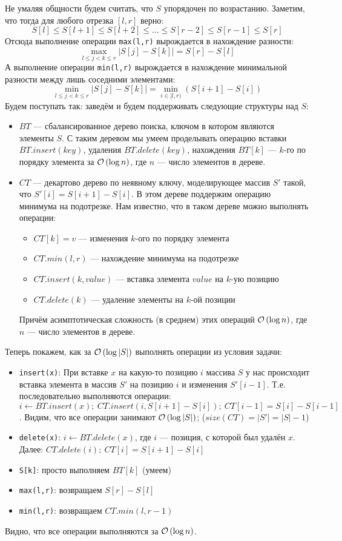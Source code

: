 \begin{solution}
Не умаляя общности будем считать, что $S$ упорядочен по возрастанию.
Заметим, что тогда для любого отрезка $[l, r]$ верно:
\[
	S[l] \leqslant S[l + 1] \leqslant S[l + 2] \leqslant \ldots \leqslant S[r - 2] \leqslant S[r - 1] \leqslant S[r]
\]
Отсюда выполнение операции \texttt{max(l,r)} вырождается в нахождение разности:
\[
	\max_{l \leqslant j < k \leqslant r}{|S[j]-S[k]|} = S[r] - S[l]
\]
А выполнение операции \texttt{min(l,r)} вырождается в нахождение минимальной разности между лишь соседними элементами:
\[
	\min_{l \leqslant j < k \leqslant r}{|S[j]-S[k]|} = \min_{i \in [l, r)}{(S[i+1]-S[i])}
\]
Будем поступать так: заведём и будем поддерживать следующие структуры над $S$: 
\begin{itemize}
	\item $BT$ --- сбалансированное дерево поиска, ключом в котором являются элементы $S$. С таким деревом мы умеем проделывать операцию вставки $BT.insert(key)$, удаления $BT.delete(key)$, нахождения $BT[k]$ --- $k$-го по порядку элемента за $\mathcal{O}\left(\log{n}\right)$, где $n$ --- число элементов в дереве.
	\item $CT$ --- декартово дерево по неявному ключу, моделирующее массив $S'$ такой, что $S'[i] = S[i + 1] - S[i]$. В этом дереве поддержим операцию минимума на подотрезке. Нам известно, что в таком дереве можно выполнять операции:
		\begin{itemize}
			\item $CT[k] = v$ --- изменения $k$-ого по порядку элемента
			\item $CT.min(l, r)$ --- нахождение минимума на подотрезке
			\item $CT.insert(k, value)$ --- вставка элемента $value$ на $k$-ую позицию
			\item $CT.delete(k)$ --- удаление элементы на $k$-ой позиции
		\end{itemize}
	Причём асимптотическая сложность (в среднем) этих операций $\mathcal{O}\left(\log{n}\right)$, где $n$ --- число элементов в дереве.
\end{itemize}
Теперь покажем, как за $\mathcal{O}\left(\log{|S|}\right)$ выполнять операции из условия задачи:
\begin{itemize}
	\item \texttt{insert(x)}: При вставке $x$ на какую-то позицию $i$ массива $S$ у нас происходит вставка элемента в массив $S'$ на позицию $i$ и изменения $S'[i - 1]$. Т.е. последовательно выполняются операции: $i \leftarrow BT.insert(x);\ CT.insert(i, S[i + 1] - S[i]);\ CT[i - 1] = S[i] - S[i - 1]$. Видим, что все операции занимают $\mathcal{O}\left(\log{|S|}\right)$; ($size(CT) = |S'| = |S| - 1$)
	\item \texttt{delete(x)}: $i \leftarrow BT.delete(x)$, где $i$ --- позиция, с которой был удалён $x$. Далее: $CT.delete(i);\ CT[i] = S[i + 1] - S[i]$
	\item \texttt{S[k]}: просто выполняем $BT[k]$ (умеем)
	\item \texttt{max(l,r)}: возвращаем $S[r] - S[l]$
	\item \texttt{min(l,r)}: возвращаем $CT.min(l, r - 1)$
\end{itemize}
Видно, что все операции выполняются за $\mathcal{O}\left(\log{n}\right)$. \xqed
\end{solution}

